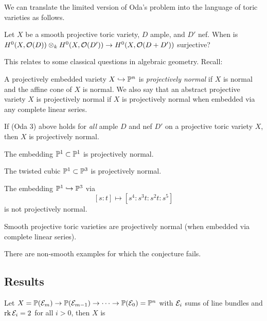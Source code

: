 \documentclass{article}
\begin{document}
We can translate the limited version of Oda's problem into the language of toric varieties as follows.

\begin{qn}[Oda 3]
	Let $X$ be a smooth projective toric variety, $D$ ample, and $D'$ nef.
	When is $H^0(X, \mathcal{O}(D)) \otimes_k H^0(X, \mathcal{O}(D')) \to H^0(X, \mathcal{O}(D + D'))$ surjective?
\end{qn}

This relates to some classical questions in algebraic geometry.
Recall:

\begin{dfn}
	A projectively embedded variety $X \hookrightarrow \mathbb{P}^n$ is \emph{projectively normal} if $X$ is normal and the affine cone of $X$ is normal.
	We also say that an abstract projective variety $X$ is projectively normal if $X$ is projectively normal when embedded via any complete linear series.
\end{dfn}

If (Oda 3) above holds for \emph{all} ample $D$ and nef $D'$ on a projective toric variety $X$, then $X$ is projectively normal.

\begin{ex}
	The embedding $\mathbb{P}^1 \subset \mathbb{P}^1$ is projectively normal.
\end{ex}

\begin{ex}
	The twisted cubic $\mathbb{P}^1 \subset \mathbb{P}^3$ is projectively normal.
\end{ex}

\begin{ex}
	The embedding $\mathbb{P}^1 \hookrightarrow \mathbb{P}^3$ via
	\[
		[s : t] \mapsto [s^4 : s^3 t : s^2 t : s^5]
	\]
	is not projectively normal.
\end{ex}

\begin{conj}[Oda]
	Smooth projective toric varieties are projectively normal (when embedded via complete linear series).
\end{conj}

There are non-smooth examples for which the conjecture fails.

\subsection{Results}

\begin{thm}[Sayrafi]
	Let $X = \mathbb{P}(\mathcal{E}_m) \to \mathbb{P}(\mathcal{E}_{m-1}) \to \dots \to \mathbb{P}(\mathcal{E}_0) = \mathbb{P}^n$ with $\mathcal{E}_i$ sums of line bundles and $\operatorname{rk} \mathcal{E}_i = 2$ for all $i > 0$, then $X$ is 
\end{thm}
\end{document}
